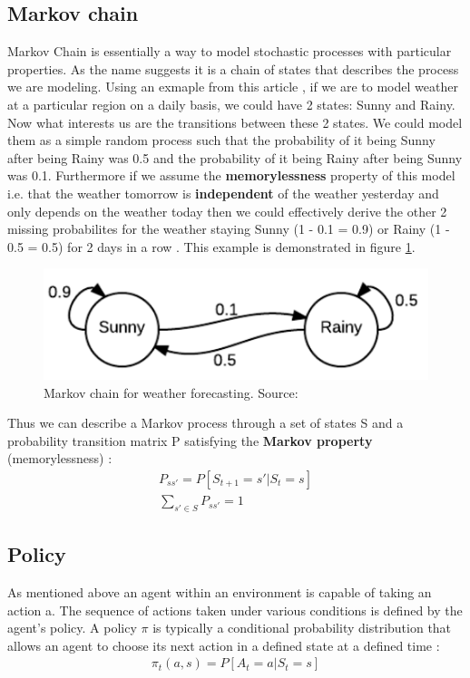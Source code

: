 \subsection{Markov chain}
Markov Chain is essentially a way to model stochastic
processes with particular properties. As the name suggests it is a chain of states that describes the process we are modeling. Using an exmaple from this article \cite{markov_chain_article}, if we
are to model weather at a particular region on a daily basis,
we could have 2 states: Sunny and Rainy. Now what interests us
are the transitions between these 2 states. We could model
them as a simple random process such that the probability of
it being Sunny after being Rainy was 0.5 and the probability
of it being Rainy after being Sunny was 0.1. Furthermore if we
assume the \textbf{memorylessness} property of this model i.e.
that the weather tomorrow is \textbf{independent} of the
weather yesterday and only depends on the weather today then
we could effectively derive the other 2 missing probabilites
for the weather staying Sunny (1 - 0.1 = 0.9) or Rainy (1 -
0.5 = 0.5) for 2 days in a row \cite{markov_chain_article}. This example is demonstrated in figure \ref{fig:weather}.

\begin{figure}[H]
  \centering
  \includegraphics[scale=0.7]{figures/markov_weather.PNG}
  \caption{Markov chain for weather forecasting. Source: \cite{markov_chain_article}}
  \label{fig:weather}
\end{figure}

Thus we can describe a Markov process through a set of states S and a probability transition matrix P satisfying the \textbf{Markov property} (memorylessness) \cite{markov_chain_article}:
\begin{align}
    P_{ss'} = P[S_{t+1} = s' | S_{t} = s]\\
    \sum_{s' \in S} P_{ss'} = 1
\end{align}

\subsection{Policy}
As mentioned above an agent within an environment is capable of taking an action a. The sequence of actions taken under 
various conditions is defined by the agent's policy.
A policy $\pi$ is typically a conditional probability distribution that allows an agent to choose its next action in a defined state at a defined time \cite{lecture_lets_go_markov}:
\begin{align}
    \pi_t(a, s) = P[A_t = a | S_t = s]
\end{align}

